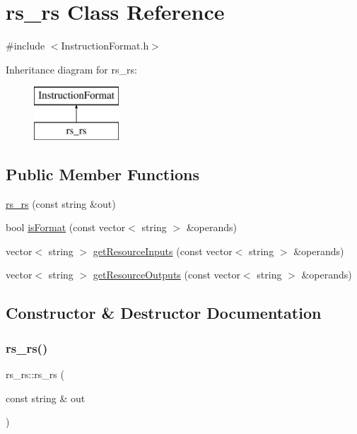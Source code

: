 \hypertarget{classrs__rs}{}\section{rs\+\_\+rs Class Reference}
\label{classrs__rs}


{\ttfamily \#include $<$Instruction\+Format.\+h$>$}

Inheritance diagram for rs\+\_\+rs\+:\begin{figure}[H]
\begin{center}
\leavevmode
\includegraphics[height=2.000000cm]{classrs__rs}
\end{center}
\end{figure}
\subsection*{Public Member Functions}
\begin{DoxyCompactItemize}
\item 
\hyperlink{classrs__rs_a0ab259a7a6119dbbc4f97ad88db801e8}{rs\+\_\+rs} (const string \&out)
\item 
bool \hyperlink{classrs__rs_a1c8ae600e477053cc3eab27edebe6b53}{is\+Format} (const vector$<$ string $>$ \&operands)
\item 
vector$<$ string $>$ \hyperlink{classrs__rs_a0f171a0f2819f3980516ee0c12707f8b}{get\+Resource\+Inputs} (const vector$<$ string $>$ \&operands)
\item 
vector$<$ string $>$ \hyperlink{classrs__rs_ad0ceb0c23af2d485184ca1229ab27483}{get\+Resource\+Outputs} (const vector$<$ string $>$ \&operands)
\end{DoxyCompactItemize}


\subsection{Constructor \& Destructor Documentation}
\mbox{\label{classrs__rs_a0ab259a7a6119dbbc4f97ad88db801e8}} 
\subsubsection{\texorpdfstring{rs\+\_\+rs()}{rs\_rs()}}
{\footnotesize\ttfamily rs\+\_\+rs\+::rs\+\_\+rs (\begin{DoxyParamCaption}\item[{const string \&}]{out }\end{DoxyParamCaption})}

